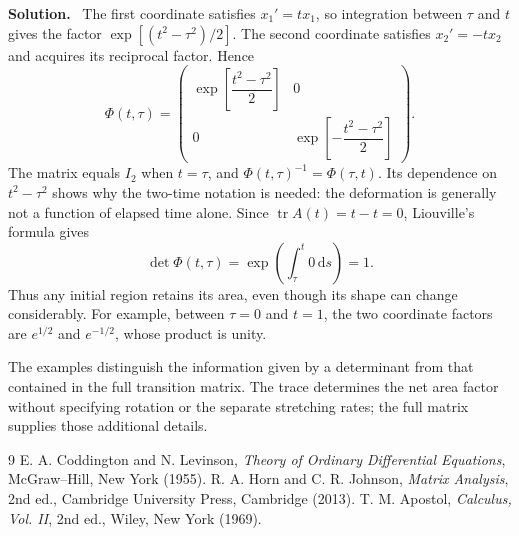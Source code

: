 \documentclass[10pt,a4paper]{article}
\newcommand{\dd}{\mathrm{d}}
\DeclareMathOperator{\tr}{tr}
\numberwithin{equation}{section}
\theoremstyle{definition}
\newenvironment{solution}{\par\noindent\textbf{Solution.}\ }{\par}
\begin{document}
\begin{solution}
The first coordinate satisfies $x_1'=t x_1$, so integration between $\tau$ and $t$ gives the factor $\exp[(t^2-\tau^2)/2]$. The second coordinate satisfies $x_2'=-t x_2$ and acquires its reciprocal factor. Hence
\begin{equation}
\Phi(t,\tau)=
\begin{pmatrix}
\exp\!\left[\dfrac{t^2-\tau^2}{2}\right]&0\\
0&\exp\!\left[-\dfrac{t^2-\tau^2}{2}\right]
\end{pmatrix}.
\label{eq:ex-time-phi}
\end{equation}
The matrix equals $I_2$ when $t=\tau$, and $\Phi(t,\tau)^{-1}=\Phi(\tau,t)$. Its dependence on $t^2-\tau^2$ shows why the two-time notation is needed: the deformation is generally not a function of elapsed time alone. Since $\tr A(t)=t-t=0$, Liouville's formula gives
\begin{equation}
\det\Phi(t,\tau)=
\exp\left(\int_{\tau}^{t}0\,\dd s\right)=1.
\label{eq:ex-time-area}
\end{equation}
Thus any initial region retains its area, even though its shape can change considerably. For example, between $\tau=0$ and $t=1$, the two coordinate factors are $e^{1/2}$ and $e^{-1/2}$, whose product is unity.
\end{solution}

The examples distinguish the information given by a determinant from that contained in the full transition matrix. The trace determines the net area factor without specifying rotation or the separate stretching rates; the full matrix supplies those additional details.

\begin{thebibliography}{9}
 E. A. Coddington and N. Levinson, \emph{Theory of Ordinary Differential Equations}, McGraw--Hill, New York (1955).
 R. A. Horn and C. R. Johnson, \emph{Matrix Analysis}, 2nd ed., Cambridge University Press, Cambridge (2013).
 T. M. Apostol, \emph{Calculus, Vol. II}, 2nd ed., Wiley, New York (1969).
\end{thebibliography}
\end{document}
